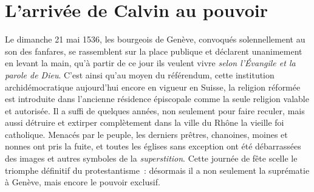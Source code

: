 \documentclass[french,twoside]{book} %
\newcommand\chapteropen{} %
\newcommand\chaptercont{} %
\begin{document}
\chapteropen
\chapter[{L’arrivée de Calvin au pouvoir}]{L’arrivée de Calvin au pouvoir}\renewcommand{\leftmark}{L’arrivée de Calvin au pouvoir}


\chaptercont
\noindent Le dimanche 21 mai 1536, les bourgeois de Genève, convoqués solennellement au son des fanfares, se rassemblent sur la place publique et déclarent unanimement en levant la main, qu’à partir de ce jour ils veulent vivre \emph{selon l’Évangile et la parole de Dieu}. C’est ainsi qu’au moyen du référendum, cette institution archidémocratique aujourd’hui encore en vigueur en Suisse, la religion réformée est introduite dans l’ancienne résidence épiscopale comme la seule religion valable et autorisée. Il a suffi de quelques années, non seulement pour faire reculer, mais aussi détruire et extirper complètement dans la ville du Rhône la vieille foi catholique. Menacés par le peuple, les derniers prêtres, chanoines, moines et nonnes ont pris la fuite, et toutes les églises sans exception ont été débarrassées des images et autres symboles de la \emph{superstition}. Cette journée de fête scelle le triomphe définitif du protestantisme : désormais il a non seulement la suprématie à Genève, mais encore le pouvoir exclusif.\par
\end{document}
